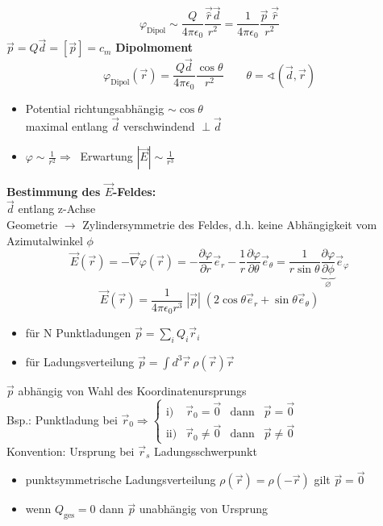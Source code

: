 \documentclass[titlepage,12pt,a4paper,ngerman]{report}
\newcommand{\tx}[1]{\textrm{#1}}
\begin{document}
$$\varphi_{\tx{Dipol}} \sim \frac{Q}{4\pi\epsilon_0} \frac{\vec{\hat{r}}\vec{d}}{r^2} = \frac{1}{4\pi\epsilon_0} \frac{\vec{p}\;\vec{\hat{r}}}{r^2} $$
$ \vec{p} = Q \vec{d} = [\vec{p}] = c_m$ \textbf{Dipolmoment}
$$\varphi_{\tx{Dipol}} (\vec{r}) = \frac{Q\vec{d}}{4\pi\epsilon_0} \frac{\cos \theta}{r^2} \qquad \theta = \sphericalangle (\vec{d}, \vec{r})$$
\begin{itemize}
\item Potential richtungsabhängig $\sim \cos \theta$\\
maximal entlang $\vec{d}$ verschwindend $\perp \vec{d}$
\item $\varphi \sim \frac{1}{r^2} \Rightarrow \ $ Erwartung $|\vec{E}| \sim \frac{1}{r^3}$
\end{itemize}
\textbf{Bestimmung des $\vec{E}$-Feldes:}\\
$\vec{d}$ entlang z-Achse\\
Geometrie $\rightarrow$ Zylindersymmetrie des Feldes, d.h. keine Abhängigkeit vom Azimutalwinkel $\phi$ 
$$\vec{E}(\vec{r}) = - \vec{\nabla} \varphi(\vec{r}) = -\frac{\partial \varphi}{\partial r} \vec{e}_r - \frac{1}{r} \frac{\partial \varphi}{\partial \theta} \vec{e}_\theta = \frac{1}{r \sin \theta} \underbrace{\frac{\partial \varphi}{\partial \phi}}_{\varnothing} \vec{e}_\varphi$$
$$ \vec{E} (\vec{r}) = \frac{1}{4\pi\epsilon_0 r^3} \; |\vec{p}| \; (2 \cos \theta \vec{e}_r + \sin \theta \vec{e}_\theta ) $$
\begin{itemize}
\item für N Punktladungen $\vec{p} = \sum_i Q_i \vec{r}_i$
\item für Ladungsverteilung $\vec{p} = \int d^3 \vec{r} \ \rho (\vec{r}) \vec{r} $
\end{itemize}
$\vec{p}$ abhängig von Wahl des Koordinatenursprungs\\[10pt]
Bsp.: Punktladung bei $\vec{r}_0 \Rightarrow \left\{ \begin{array}{cccc}
\textrm{i)} & \vec{r}_0 = \vec{0} & \textrm{dann} & \vec{p} = \vec{0} \\
\textrm{ii)} & \vec{r}_0 \neq \vec{0} & \textrm{dann} & \vec{p} \neq \vec{0}
\end{array} \right. $ \\[10pt]
Konvention: Ursprung bei $\vec{r}_s$ Ladungsschwerpunkt
\begin{itemize}
\item punktsymmetrische Ladungsverteilung $ \rho(\vec{r}) = \rho(-\vec{r})$ gilt $\vec{p} = \vec{0}$
\item wenn $Q_{\tx{ges}} = 0$ dann $\vec{p}$ unabhängig von Ursprung
\end{itemize}
\end{document}
